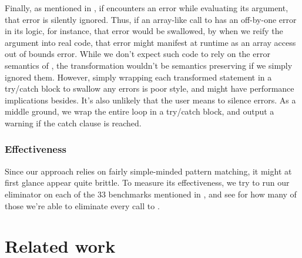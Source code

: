 Finally, as mentioned in , if  encounters an error
while evaluating its argument, that error is silently ignored. Thus, if an
array-like call to  has an off-by-one error in its logic, for
instance, that error would be swallowed, by when we reify the argument into
real code, that error might manifest at runtime as an array access out of
bounds error. While we don't expect such code to rely on the error semantics of
, the transformation wouldn't be semantics preserving if we simply
ignored them. However, simply wrapping each transformed statement in a
try/catch block to swallow any errors is poor style, and might have performance
implications besides. It's also unlikely that the user means to silence errors.
As a middle ground, we wrap the entire loop in a try/catch block, and output a
warning if the catch clause is reached.

\subsubsection{Effectiveness}

Since our approach relies on fairly simple-minded pattern matching, it might at
first glance appear quite brittle. To measure its effectiveness, we try to run
our eliminator on each of the 33 benchmarks mentioned in
, and see for how many of those we're able to
eliminate every call to .

\section{Related work}
